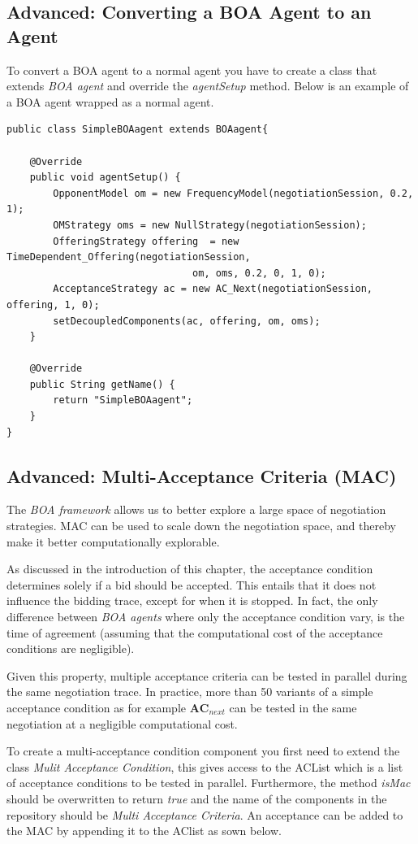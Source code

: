 \documentclass[]{article}
\begin{document}
\subsection{Advanced: Converting a BOA Agent to an Agent}
To convert a BOA agent to a normal agent you have to create a class that extends \textit{BOA agent} and override the \textit{agentSetup} method. Below is an example of a BOA agent wrapped as a normal agent.

\begin{lstlisting}
public class SimpleBOAagent extends BOAagent{

	@Override
	public void agentSetup() {
		OpponentModel om = new FrequencyModel(negotiationSession, 0.2, 1);
		OMStrategy oms = new NullStrategy(negotiationSession);
		OfferingStrategy offering  = new TimeDependent_Offering(negotiationSession,
								om, oms, 0.2, 0, 1, 0);
		AcceptanceStrategy ac = new AC_Next(negotiationSession, offering, 1, 0);
		setDecoupledComponents(ac, offering, om, oms);		
	}

	@Override
	public String getName() {
		return "SimpleBOAagent";
	}
}
\end{lstlisting}

\subsection{Advanced: Multi-Acceptance Criteria (MAC)}
The \textit{BOA framework} allows us to better explore a large space of negotiation strategies. MAC can be used to scale down the negotiation space, and thereby make it better computationally explorable.

As discussed in the introduction of this chapter, the acceptance condition determines solely if a bid should be accepted. This entails that it does not influence the bidding trace, except for when it is stopped. In fact, the only difference between \textit{BOA agents} where only the acceptance condition vary, is the time of agreement (assuming that the computational cost of the acceptance conditions are negligible).

Given this property, multiple acceptance criteria can be tested in parallel during the same negotiation trace. In practice, more than 50 variants of a simple acceptance condition as for example $\textbf{AC}_{next}$ can be tested in the same negotiation at a negligible computational cost.

To create a multi-acceptance condition component you first need to extend the class \textit{Mulit Acceptance Condition}, this gives access to the ACList which is a list of acceptance conditions to be tested in parallel. Furthermore, the method \textit{isMac} should be overwritten to return \textit{true} and the name of the components in the repository should be \textit{Multi Acceptance Criteria}. An acceptance can be added to the MAC by appending it to the AClist as sown below. 
\end{document}
